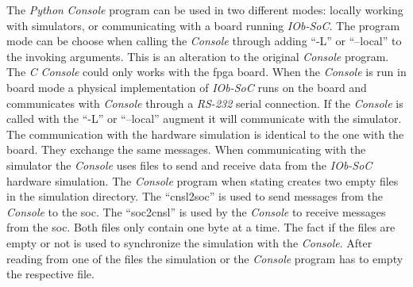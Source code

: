 The \textit{Python} \textit{Console} program can be used in two different modes: locally working with simulators, or communicating with a board running \textit{IOb-SoC}. The program mode can be choose when calling the \textit{Console} through adding \enquote{-L} or \enquote{--local} to the invoking arguments. This is an alteration to the original \textit{Console} program. The \textit{C} \textit{Console} could only works with the \acrshort{fpga} board. When the \textit{Console} is run in board mode a physical implementation of \textit{IOb-SoC} runs on the board and communicates with \textit{Console} through a \textit{RS-232} serial connection. If the \textit{Console} is called with the \enquote{-L} or \enquote{--local} augment it will communicate with the simulator. The communication with the hardware simulation is identical to the one with the board. They exchange the same messages. When communicating with the simulator the \textit{Console} uses files to send and receive data from the \textit{IOb-SoC} hardware simulation. The \textit{Console} program when stating creates two empty files in the simulation directory. The \enquote{cnsl2soc} is used to send messages from the \textit{Console} to the \acrshort{soc}. The \enquote{soc2cnsl} is used by the \textit{Console} to receive messages from the \acrshort{soc}. Both files only contain one byte at a time. The fact if the files are empty or not is used to synchronize the simulation with the \textit{Console}. After reading from one of the files the simulation or the \textit{Console} program has to empty the respective file.

